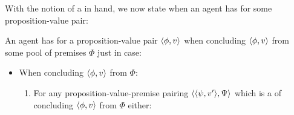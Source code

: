 \begin{note}
  With the notion of a \requ{} in hand, we now state when an agent has  for some proposition-value pair:

    \begin{idea}[\iZS{-} --- \iZS{}]
      \label{idea:Zs:overview}
      \label{idea:zs}
    An agent \vAgent{} has \emph{\ZS{-}} for a proposition-value pair \(\langle \phi, v \rangle\) when concluding \(\langle \phi, v \rangle\) from some pool of premises \(\Phi\) just in case:
    \begin{itemize}
    \item When concluding \(\langle \phi, v \rangle\) from \(\Phi\):
    \begin{enumerate}[label=\arabic*., ref=\named{CS:\arabic*}]
    \item
      \label{idea:Zs:overview:requ}
      For any proposition-value-premise pairing \(\langle \langle \psi, v' \rangle, \Psi \rangle\) which is a \requ{} of concluding \(\langle \phi, v \rangle\) from \(\Phi\) either:
      \begin{enumerate}[label=\alph*., ref=\named{CS:1.\alph*}]

\end{enumerate}
\end{enumerate}
\end{itemize}
\end{idea}
\end{note}
